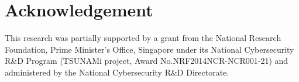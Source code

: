 \section{Acknowledgement}
This research was partially supported by a grant from the National Research 
Foundation, Prime Minister’s Office, Singapore under its National Cybersecurity 
R\&D Program (TSUNAMi project, Award No.NRF2014NCR-NCR001-21) and administered 
by the National Cybersecurity R\&D Directorate.
